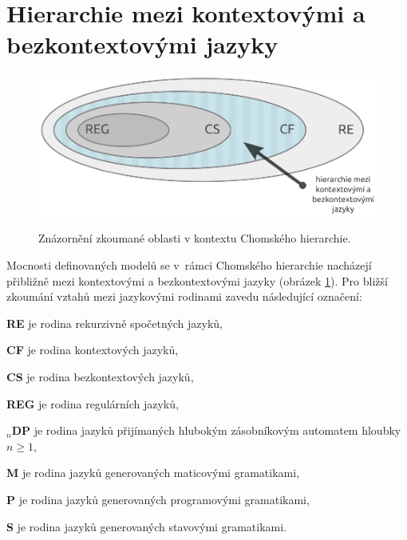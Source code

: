 \section{Hierarchie mezi kontextovými a bezkontextovými jazyky} \label{kap_teorie_hierarchie}


\begin{figure}[ht]
\centering
\includegraphics{img/bp_hierarchy01.eps} \bigskip \\
\caption{Znázornění zkoumané oblasti v kontextu Chomského hierarchie.}
\label{obr_chom_hierarchy}
\end{figure}

Mocnosti definovaných modelů se v~rámci Chomského hierarchie nacházejí přibližně mezi kontextovými a bezkontextovými jazyky (obrázek \ref{obr_chom_hierarchy}). Pro bližší zkoumání vztahů mezi jazykovými rodinami zavedu následující označení:

\begin{description*}
\item{\textbf{RE}} je rodina rekurzivně spočetných jazyků,
\item{\textbf{CF}} je rodina kontextových jazyků,
\item{\textbf{CS}} je rodina bezkontextových jazyků,
\item{\textbf{REG}} je rodina regulárních jazyků,

\item{\textbf{${}_n$DP}} je rodina jazyků přijímaných hlubokým zásobníkovým automatem hloubky $n \ge 1$,

\item{\textbf{M}} je rodina jazyků generovaných maticovými gramatikami,
\item{\textbf{P}} je rodina jazyků generovaných programovými gramatikami,
\item{\textbf{S}} je rodina jazyků generovaných stavovými gramatikami.

\end{description*}

